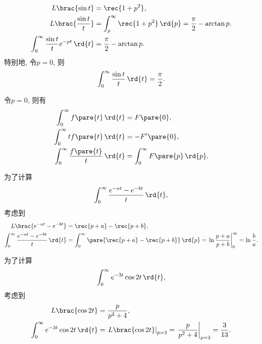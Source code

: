 \documentclass[../ComplexVariable.tex]{subfiles}
\begin{document}
\begin{sample}
    \begin{ex}
        \begin{align*}
            L\brac{\sin t} &= \rec{1+p^2}, \\
            L\brac{\frac{\sin t}{t}} &= \int_p^\infty \rec{1+p^2}\,\rd{p} = \frac{\pi}{2} - \arctan p. \\
            \int_0^\infty \frac{\sin t}{t} e^{-pt}\,\rd{t} &= \frac{\pi}{2} - \arctan p.
        \end{align*}
        特别地, 令$p = 0$, 则
        \[ \int_0^\infty \frac{\sin t}{t}\,\rd{t} = \frac{\pi}{2}. \]
    \end{ex}
\end{sample}
\begin{remark}
    令$p=0$, 则有
    \begin{align*}
        \int_0^\infty f\pare{t}\,\rd{t} &= F\pare{0}, \\
        \int_0^\infty tf\pare{t}\,\rd{t} &= -F'\pare{0}, \\
        \int_0^\infty \frac{f\pare{t}}{t}\,\rd{t} &= \int_0^\infty F\pare{p}\,\rd{p}.
    \end{align*}
\end{remark}
\begin{sample}
    \begin{ex}
        为了计算
        \[ \int_0^\infty \frac{e^{-at}- e^{-bt}}{t}\,\rd{t}, \]
        考虑到
        \begin{align*}
            L\brac{e^{-at} - e^{-bt}} &= \rec{p+a} - \rec{p+b}, \\
            \int_0^\infty \frac{e^{-at}- e^{-bt}}{t}\,\rd{t} &= \int_0^\infty \pare{\rec{p+a} - \rec{p+b}}\,\rd{p} = \left.\ln \frac{p+a}{p+b}\right\vert_0^\infty = \ln \frac{b}{a}.
        \end{align*}
    \end{ex}
\end{sample}
\begin{sample}
    \begin{ex}
        为了计算
        \[ \int_0^\infty e^{-3t}\cos 2t\,\rd{t}, \]
        考虑到
        \begin{align*}
            L\brac{\cos 2t} &= \frac{p}{p^2+4}, \\
        \int_0^\infty e^{-3t}\cos 2t\,\rd{t} &= \left. L\brac{\cos 2t}\right\vert_{p=3} = \left. \frac{p}{p^2+4}\right\vert_{p=3} = \frac{3}{13}.
        \end{align*}
    \end{ex}
\end{sample}
\end{document}
